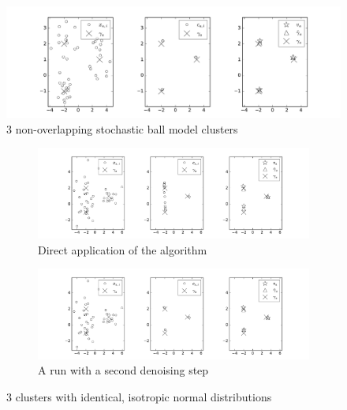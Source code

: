 \documentclass[10pt,a4paper]{article}
\begin{document}
\begin{figure}[h]
  \centering
  \includegraphics[width=\textwidth]{figures/results-3sb}
  \caption{3 non-overlapping stochastic ball model clusters}
  \label{fig:results-balls}
\end{figure}

\begin{figure}[h]
  \centering
  \begin{subfigure}{\textwidth}
    \centering
    \includegraphics[width=\textwidth]{figures/results-3nm}
    \caption{Direct application of the algorithm}
\label{fig:results-normals}
  \end{subfigure}
  \begin{subfigure}{\textwidth}
    \centering
    \includegraphics[width=\textwidth]{figures/results-3nm-iterated}
    \caption{A run with a second denoising step}
\label{fig:results-normals-iterated}
  \end{subfigure}
  \caption{3 clusters with identical, isotropic normal distributions}
\end{figure}
\end{document}
